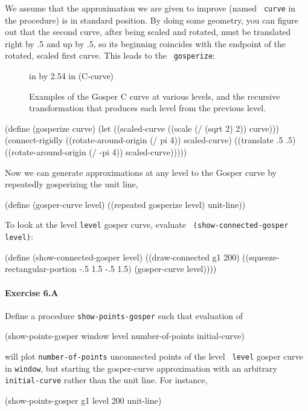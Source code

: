 We assume that the approximation we are given to improve (named {\tt
curve} in the procedure) is in standard position.  By doing some
geometry, you can figure out that the second curve, after being scaled
and rotated, must be translated right by .5 and up by .5, so its beginning
coincides with the endpoint of the rotated, scaled first curve.  This leads
to the \UT\ {\tt gosperize}:


\begin{figure}
 in by 2.54 in (C-curve)
\caption{{\protect\footnotesize
Examples of the Gosper C curve at various levels, and 
the recursive transformation that produces each level from the previous
level.}}
\label{Gosper}
\end{figure}

\beginlisp
(define (gosperize curve)
  (let ((scaled-curve ((scale (/ (sqrt 2) 2)) curve)))
    (connect-rigidly ((rotate-around-origin (/ pi 4)) scaled-curve)
                     ((translate .5 .5)
                      ((rotate-around-origin (/ -pi 4)) scaled-curve)))))
\endlisp

Now we can generate approximations at any level to the Gosper curve by
repeatedly gosperizing the unit line,

\beginlisp
(define (gosper-curve level)
    ((repeated gosperize level) unit-line))
\endlisp

To look at the level {\tt level} gosper curve, evaluate {\tt
(show-connected-gosper level)}:

\beginlisp
(define (show-connected-gosper level)
  ((draw-connected g1 200)
   ((squeeze-rectangular-portion -.5 1.5 -.5 1.5)
    (gosper-curve level))))
\endlisp

\paragraph{Exercise 6.A} Define a procedure {\tt show-points-gosper}
such that evaluation of

\beginlisp
(show-points-gosper window level number-of-points initial-curve)
\endlisp

\noindent
will plot {\tt number-of-points} unconnected points of the level {\tt
level} gosper curve in {\tt window}, but starting the gosper-curve
approximation with an arbitrary {\tt initial-curve} rather than the unit
line.  For instance,

\beginlisp
(show-points-gosper g1 level 200 unit-line)
\endlisp

